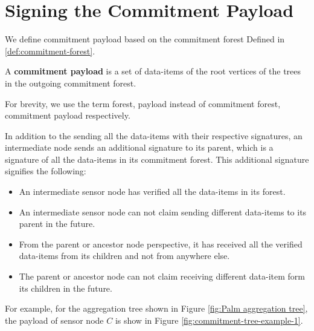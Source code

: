 \section{Signing the Commitment Payload}
		We define commitment payload based on the commitment forest Defined in \ref{def:commitment-forest}.
	\begin{definition}
		A \textbf{commitment payload} is a set of data-items of the root vertices of the trees in the outgoing commitment forest.
	\end{definition}
	For brevity, we use the term forest, payload instead of commitment forest, commitment payload respectively.

	In addition to the sending all the data-items with their respective signatures, an intermediate node sends an additional signature to its parent, which is a signature of all the data-items in its commitment forest.
	This additional signature signifies the following:
	\begin{itemize}
		\item	An intermediate sensor node has verified all the data-items in its forest.
		\item An intermediate sensor node can not claim sending different data-items to its parent in the future.
		\item From the parent or ancestor node perspective, it has received all the verified data-items from its children and not from anywhere else.
		\item The parent or ancestor node can not claim receiving different data-item form its children in the future.
	\end{itemize}
	For example, for the aggregation tree shown in Figure \ref{fig:Palm aggregation tree}, the payload of sensor node $C$ is show in Figure \ref{fig:commitment-tree-example-1}.
